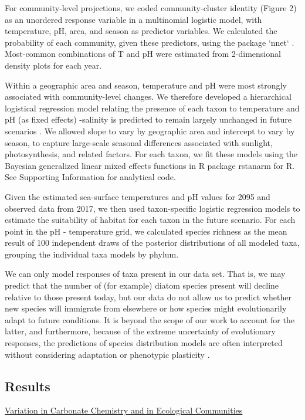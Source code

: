 \documentclass[11pt]{article}
\begin{document}
\begin{linenumbers}
For community-level projections, we coded community-cluster identity (Figure 2) as an unordered response variable in a multinomial logistic model, with temperature, pH, area, and season as predictor variables. We calculated the probability of each community, given these predictors, using the package `nnet` \cite{nnet2002}. Most-common combinations of T and pH were estimated from 2-dimensional density plots for each year. 

Within a geographic area and season, temperature and pH were most strongly associated with community-level changes. We therefore developed a hierarchical logistical regression model relating the presence of each taxon to temperature and pH (as fixed effects) {\color{red} -salinity is predicted to remain largely unchanged in future scenarios \cite{khangaonkar2019salish}. We allowed} slope to vary by geographic area and intercept to vary by season, to capture large-scale seasonal differences associated with sunlight, photosynthesis, and related factors. For each taxon, we fit these models using the Bayesian generalized linear mixed effects functions in R package rstanarm \cite{rstanarm} for R. See Supporting Information for analytical code. 

Given the estimated sea-surface temperatures and pH values for 2095 and observed data from 2017, we then used taxon-specific logistic regression models to estimate the suitability of habitat for each taxon in the future scenario. For each point in the pH - temperature grid, we calculated species richness as the mean result of 100 independent draws of the posterior distributions of all modeled taxa, grouping the individual taxa models by phylum.

We can only model responses of taxa present in our data set. That is, we may predict that the number of (for example) diatom species present will decline relative to those present today, but our data do not allow us to predict whether new species will immigrate from elsewhere or how species might evolutionarily adapt to future conditions. It is beyond the scope of our work to account for the latter, and furthermore, because of the extreme uncertainty of evolutionary responses, the predictions of species distribution models are often interpreted without considering adaptation or phenotypic plasticity \cite{moore2015present}. 



\subsection*{Results}
\underline{Variation in Carbonate Chemistry and in Ecological Communities}



\end{linenumbers}
\end{document}
